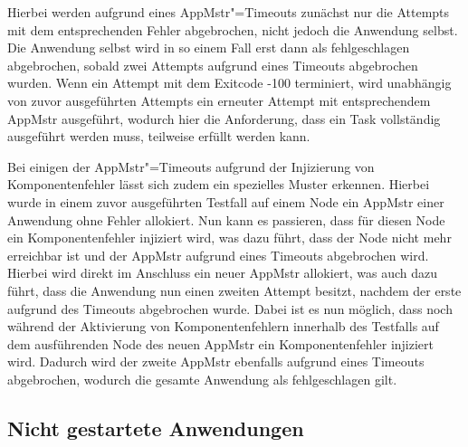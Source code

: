 Hierbei werden aufgrund eines \gls{AppMstr}"=Timeouts zunächst nur die Attempts mit dem entsprechenden Fehler abgebrochen, nicht jedoch die Anwendung selbst.
Die Anwendung selbst wird in so einem Fall erst dann als fehlgeschlagen abgebrochen, sobald zwei Attempts aufgrund eines Timeouts abgebrochen wurden.
Wenn ein Attempt mit dem Exitcode -100 terminiert, wird unabhängig von zuvor ausgeführten Attempts ein erneuter Attempt mit entsprechendem \gls{AppMstr} ausgeführt, wodurch hier die Anforderung, dass ein Task vollständig ausgeführt werden muss, teilweise erfüllt werden kann.

Bei einigen der \gls{AppMstr}"=Timeouts aufgrund der Injizierung von Komponentenfehler lässt sich zudem ein spezielles Muster erkennen.
Hierbei wurde in einem zuvor ausgeführten Testfall auf einem Node ein \gls{AppMstr} einer Anwendung ohne Fehler allokiert.
Nun kann es passieren, dass für diesen Node ein Komponentenfehler injiziert wird, was dazu führt, dass der Node nicht mehr erreichbar ist und der \gls{AppMstr} aufgrund eines Timeouts abgebrochen wird.
Hierbei wird direkt im Anschluss ein neuer \gls{AppMstr} allokiert, was auch dazu führt, dass die Anwendung nun einen zweiten Attempt besitzt, nachdem der erste aufgrund des Timeouts abgebrochen wurde.
Dabei ist es nun möglich, dass noch während der Aktivierung von Komponentenfehlern innerhalb des Testfalls auf dem ausführenden Node des neuen \gls{AppMstr} ein Komponentenfehler injiziert wird.
Dadurch wird der zweite \gls{AppMstr} ebenfalls aufgrund eines Timeouts abgebrochen, wodurch die gesamte Anwendung als fehlgeschlagen gilt.

\subsection{Nicht gestartete Anwendungen}
\label{subsec:notStartedApps}

